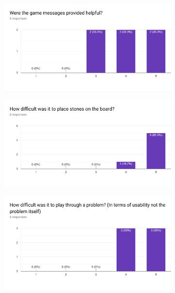 \documentclass{l4proj}
\begin{document}
\begin{appendices}
\begin{figure}[H]
\centering
\begin{subfigure}[b]{\textwidth}
\centering
\includegraphics[width=\textwidth]{A1/7.png}
\end{subfigure}
\end{figure}


\begin{figure}[H]
\centering
\begin{subfigure}[b]{\textwidth}
\centering
\includegraphics[width=\textwidth]{A1/8.png}
\end{subfigure}
\end{figure}


\begin{figure}[H]
\centering
\begin{subfigure}[b]{\textwidth}
\centering
\includegraphics[width=\textwidth]{A1/9.png}
\end{subfigure}
\end{figure}


\end{appendices}
\end{document}
